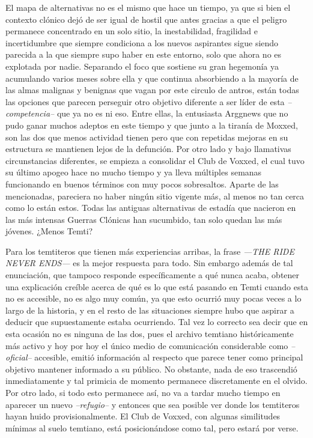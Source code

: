 \documentclass[
  spanish,
]{book}
\begin{document}
El mapa de alternativas no es el mismo que hace un tiempo, ya que si bien el contexto clónico dejó de ser igual de hostil que antes gracias a que el peligro permanece concentrado en un solo sitio, la inestabilidad, fragilidad e incertidumbre que siempre condiciona a los nuevos aspirantes sigue siendo parecida a la que siempre supo haber en este entorno, solo que ahora no es explotada por nadie.
Separando el foco que sostiene su gran hegemonía ya acumulando varios meses sobre ella y que continua absorbiendo a la mayoría de las almas malignas y benignas que vagan por este circulo de antros, están todas las opciones que parecen perseguir otro objetivo diferente a ser líder de esta \emph{--competencia--} que ya no es ni eso. Entre ellas, la entusiasta Arggnews que no pudo ganar muchos adeptos en este tiempo y que junto a la tiranía de Moxxed, son las dos que menos actividad tienen pero que con repetidas mejoras en su estructura se mantienen lejos de la defunción. Por otro lado y bajo llamativas circunstancias diferentes, se empieza a consolidar el Club de Voxxed, el cual tuvo su último apogeo hace no mucho tiempo y ya lleva múltiples semanas funcionando en buenos términos con muy pocos sobresaltos.
Aparte de las mencionadas, pareciera no haber ningún sitio vigente más, al menos no tan cerca como lo están estos. Todas las antiguas alternativas de estadía que nacieron en las más intensas Guerras Clónicas han sucumbido, tan solo quedan las más jóvenes. ¿Menos Temti?

Para los temtiteros que tienen más experiencias arribas, la frase \emph{---THE RIDE NEVER ENDS---} es la mejor respuesta para todo. Sin embargo además de tal enunciación, que tampoco responde específicamente a qué nunca acaba, obtener una explicación creíble acerca de qué es lo que está pasando en Temti cuando esta no es accesible, no es algo muy común, ya que esto ocurrió muy pocas veces a lo largo de la historia, y en el resto de las situaciones siempre hubo que aspirar a deducir que supuestamente estaba ocurriendo.
Tal vez lo correcto sea decir que en esta ocasión no es ninguna de las dos, pues el archivo temtiano históricamente más activo y hoy por hoy el único medio de comunicación considerable como \emph{--oficial--} accesible, emitió información al respecto que parece tener como principal objetivo mantener informado a su público.
No obstante, nada de eso trascendió inmediatamente y tal primicia de momento permanece discretamente en el olvido. Por otro lado, si todo esto permanece así, no va a tardar mucho tiempo en aparecer un nuevo \emph{--refugio--} y entonces que sea posible ver donde los temtiteros hayan huido provisionalmente. El Club de Voxxed, con algunas similitudes mínimas al suelo temtiano, está posicionándose como tal, pero estará por verse.
\end{document}
